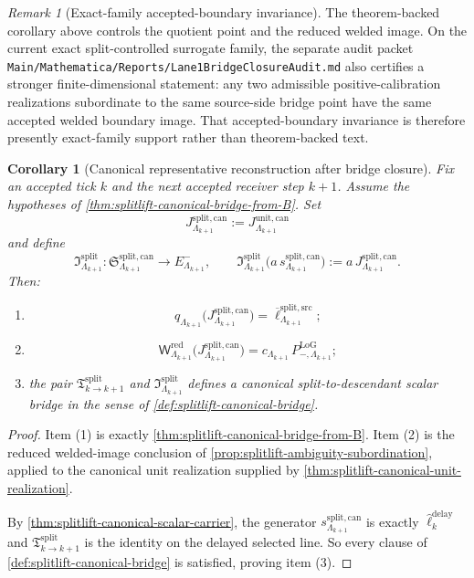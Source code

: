 \documentclass[11pt]{article}
\theoremstyle{definition}
\theoremstyle{plain}
\newtheorem{corollary}[definition]{Corollary}
\theoremstyle{remark}
\newtheorem{remark}[definition]{Remark}
\newcommand{\1}{\mathbf 1}
\begin{document}
\begin{remark}[Exact-family accepted-boundary invariance]
\label{rem:splitlift-unit-realization-accepted-boundary-audit}
The theorem-backed corollary above controls the quotient point and the reduced welded image.
On the current exact split-controlled surrogate family, the separate audit packet
\texttt{Main/Mathematica/Reports/Lane1BridgeClosureAudit.md} also certifies a stronger
finite-dimensional statement: any two admissible positive-calibration realizations subordinate to the
same source-side bridge point have the same accepted welded boundary image.
That accepted-boundary invariance is therefore presently exact-family support rather than
theorem-backed text.
\end{remark}

\begin{corollary}[Canonical representative reconstruction after bridge closure]
\label{cor:splitlift-canonical-bridge-reconstruction}
Fix an accepted tick \(k\) and the next accepted receiver step \(k+1\).
Assume the hypotheses of \cref{thm:splitlift-canonical-bridge-from-B}.
Set
\[
J^{\mathrm{split,can}}_{\Lambda_{k+1}}
:=
J^{\mathrm{unit,can}}_{\Lambda_{k+1}}
\]
and define
\[
\mathfrak I^{\mathrm{split}}_{\Lambda_{k+1}}
:
\mathfrak S^{\mathrm{split,can}}_{\Lambda_{k+1}}
\longrightarrow
E^-_{\Lambda_{k+1}},
\qquad
\mathfrak I^{\mathrm{split}}_{\Lambda_{k+1}}
\bigl(
a\,s^{\mathrm{split,can}}_{\Lambda_{k+1}}
\bigr)
:=
a\,J^{\mathrm{split,can}}_{\Lambda_{k+1}}.
\]
Then:
\begin{enumerate}[leftmargin=2em]
\item
  \[
  q_{\Lambda_{k+1}}
  \!\bigl(
  J^{\mathrm{split,can}}_{\Lambda_{k+1}}
  \bigr)
  =
  \overline\ell^{\mathrm{split,src}}_{\Lambda_{k+1}};
  \]
\item
  \[
  \mathsf W^{\mathrm{red}}_{\Lambda_{k+1}}
  \!\bigl(
  J^{\mathrm{split,can}}_{\Lambda_{k+1}}
  \bigr)
  =
  c_{\Lambda_{k+1}}\,
  P^{\mathrm{LoG}}_{-,\Lambda_{k+1}};
  \]
\item the pair
  \(
  \mathfrak T^{\mathrm{split}}_{k\to k+1}
  \)
  and
  \(
  \mathfrak I^{\mathrm{split}}_{\Lambda_{k+1}}
  \)
  defines a canonical split-to-descendant scalar bridge in the sense of
  \cref{def:splitlift-canonical-bridge}.
\end{enumerate}
\end{corollary}

\begin{proof}
Item \textnormal{(1)} is exactly \cref{thm:splitlift-canonical-bridge-from-B}.
Item \textnormal{(2)} is the reduced welded-image conclusion of
\cref{prop:splitlift-ambiguity-subordination}, applied to the canonical unit realization supplied by
\cref{thm:splitlift-canonical-unit-realization}.

By \cref{thm:splitlift-canonical-scalar-carrier}, the generator
\(
s^{\mathrm{split,can}}_{\Lambda_{k+1}}
\)
is exactly
\(
\widehat\ell^{\mathrm{delay}}_k
\)
and
\(
\mathfrak T^{\mathrm{split}}_{k\to k+1}
\)
is the identity on the delayed selected line.
So every clause of \cref{def:splitlift-canonical-bridge} is satisfied, proving item
\textnormal{(3)}.
\end{proof}
\end{document}
